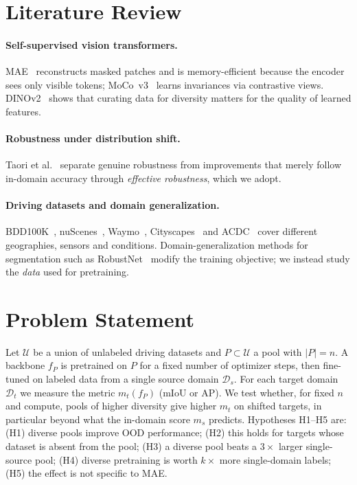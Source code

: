 \documentclass{article}
\begin{document}
\section{Literature Review}
\paragraph{Self-supervised vision transformers.}
MAE~\cite{he2022mae} reconstructs masked patches and is memory-efficient because the encoder sees only visible
tokens; MoCo~v3~\cite{chen2021mocov3} learns invariances via contrastive views. DINOv2~\cite{oquab2024dinov2}
shows that curating data for diversity matters for the quality of learned features.
\paragraph{Robustness under distribution shift.}
Taori et al.~\cite{taori2020measuring} separate genuine robustness from improvements that merely follow in-domain
accuracy through \emph{effective robustness}, which we adopt.
\paragraph{Driving datasets and domain generalization.}
BDD100K~\cite{yu2020bdd100k}, nuScenes~\cite{caesar2020nuscenes}, Waymo~\cite{sun2020waymo}, Cityscapes~\cite{cordts2016cityscapes}
and ACDC~\cite{sakaridis2021acdc} cover different geographies, sensors and conditions. Domain-generalization methods for
segmentation such as RobustNet~\cite{choi2021robustnet} modify the training objective; we instead study the
\emph{data} used for pretraining.

\section{Problem Statement}
Let $\mathcal{U}$ be a union of unlabeled driving datasets and $P \subset \mathcal{U}$ a pool with $|P|=n$.
A backbone $f_P$ is pretrained on $P$ for a fixed number of optimizer steps, then fine-tuned on labeled data from a
single source domain $\mathcal{D}_s$. For each target domain $\mathcal{D}_t$ we measure the metric $m_t(f_P)$
(mIoU or AP). We test whether, for fixed $n$ and compute, pools of higher diversity give higher
$m_t$ on shifted targets, in particular beyond what the in-domain score $m_s$ predicts.
Hypotheses H1--H5 are: (H1) diverse pools improve OOD performance; (H2) this holds for targets whose dataset is absent
from the pool; (H3) a diverse pool beats a $3\times$ larger single-source pool; (H4) diverse pretraining is worth
$k\times$ more single-domain labels; (H5) the effect is not specific to MAE.
\end{document}

